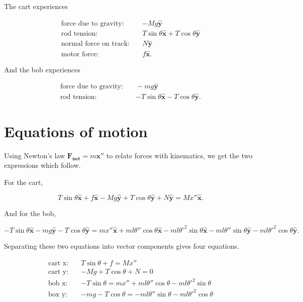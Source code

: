 \documentclass[12pt]{article}
\begin{document}
The cart experiences

\begin{align}
\mbox{force due to gravity:} &\quad {-M} g \mathbf{\hat{y}} \nonumber\\[5pt]
\mbox{rod tension:} &\quad T \sin{\theta} \mathbf{\hat{x}} + T \cos{\theta} \mathbf{\hat{y}} \nonumber\\[5pt]
\mbox{normal force on track:} &\quad N \mathbf{\hat{y}} \nonumber\\[5pt]
\mbox{motor force:} &\quad f \mathbf{\hat{x}}. \nonumber
\end{align}

And the bob experiences

\begin{align}
\mbox{force due to gravity:} &\quad -m g \mathbf{\hat{y}} \nonumber\\[5pt]
\mbox{rod tension:} &\quad {-T} \sin{\theta} \mathbf{\hat{x}} - T \cos{\theta} \mathbf{\hat{y}}. \nonumber
\end{align}

\section{Equations of motion}

Using Newton's law $\mathbf{F_{net}} = m \mathbf{x''}$ to relate forces with kinematics, we get the two expressions which follow.

For the cart,

\begin{equation}
T \sin{\theta} \mathbf{\hat{x}} + f \mathbf{\hat{x}} - M g \mathbf{\hat{y}} + T \cos{\theta} \mathbf{\hat{y}} + N \mathbf{\hat{y}} = M x'' \mathbf{\hat{x}}.
\end{equation}

And for the bob,

\begin{equation}
-T \sin{\theta} \mathbf{\hat{x}} - m g \mathbf{\hat{y}} - T \cos{\theta} \mathbf{\hat{y}} = m x'' \mathbf{\hat{x}} + m l \theta'' \cos{\theta} \mathbf{\hat{x}} - m l \theta'^2 \sin{\theta} \mathbf{\hat{x}} - m l \theta'' \sin{\theta} \mathbf{\hat{y}} - m l \theta'^2 \cos{\theta} \mathbf{\hat{y}}.
\end{equation}

Separating these two equations into vector components gives four equations.

\begin{align}
\label{eq:a} \mbox{cart x:} &\quad T \sin{\theta} + f = M x'' \\[5pt]
\mbox{cart y:} &\quad {-M} g + T \cos{\theta} + N = 0 \\[5pt]
\label{eq:b} \mbox{bob x:} &\quad {-T} \sin{\theta} = m x'' + m l \theta'' \cos{\theta} - m l \theta'^2 \sin{\theta} \\[5pt]
\label{eq:c} \mbox{box y:} &\quad {-m} g - T \cos{\theta} = -m l \theta'' \sin{\theta} - m l \theta'^2 \cos{\theta}
\end{align}
\end{document}
